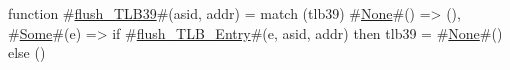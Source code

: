 function #\hyperref[sailRISCVzflushzyTLB39]{flush\_TLB39}#(asid, addr) =
  match (tlb39) {
    #\hyperref[sailRISCVzNone]{None}#()  => (),
    #\hyperref[sailRISCVzSome]{Some}#(e) => if   #\hyperref[sailRISCVzflushzyTLBzyEntry]{flush\_TLB\_Entry}#(e, asid, addr)
               then tlb39 = #\hyperref[sailRISCVzNone]{None}#()
               else ()
  }
